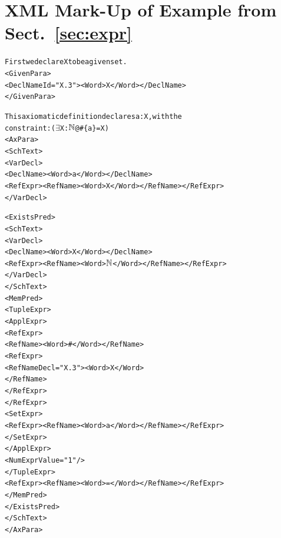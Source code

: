 \documentclass{llncs}  %
\begin{document}
\section{XML Mark-Up of Example from Sect.~\ref{sec:expr}}
\newcommand{\NAT}{$\nat$}
\newcommand{\EXISTS}{$\exists$}
\begin{small}
\begin{alltt}
  First we declare X to be a given set. 
  <GivenPara>
    <DeclName Id="X.3"> <Word>X</Word> </DeclName>
  </GivenPara>

  This axiomatic definition declares a:X, with the
  constraint: (\EXISTS X:\NAT @ #\{a\} = X)
  <AxPara>
    <SchText>
      <VarDecl>
        <DeclName> <Word>a</Word> </DeclName>
        <RefExpr><RefName><Word>X</Word></RefName></RefExpr>
      </VarDecl>

      <ExistsPred>
        <SchText>
          <VarDecl>
            <DeclName> <Word>X</Word> </DeclName>
            <RefExpr><RefName><Word>\NAT</Word></RefName></RefExpr>
          </VarDecl>
        </SchText>
        <MemPred>
          <TupleExpr>
            <ApplExpr>
              <RefExpr>
                <RefName><Word>#</Word></RefName>
                <RefExpr>
                  <RefName Decl="X.3"> <Word>X</Word>
                  </RefName>
                </RefExpr>
              </RefExpr>
              <SetExpr>
                <RefExpr><RefName><Word>a</Word></RefName></RefExpr>
              </SetExpr>
            </ApplExpr>
            <NumExpr Value="1"/>
          </TupleExpr>
          <RefExpr><RefName><Word>=</Word></RefName></RefExpr>
        </MemPred>
      </ExistsPred>
    </SchText>
  </AxPara>
\end{alltt}
\end{small}
\end{document}
